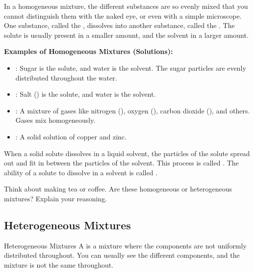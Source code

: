 In a homogeneous mixture, the different substances are so evenly mixed that you cannot distinguish them with the naked eye, or even with a simple microscope.  One substance, called the , dissolves into another substance, called the . The solute is usually present in a smaller amount, and the solvent in a larger amount.

\begin{example}
\textbf{Examples of Homogeneous Mixtures (Solutions):}
\begin{itemize}
    \item {}: Sugar is the solute, and water is the solvent. The sugar particles are evenly distributed throughout the water.
    \item {}: Salt () is the solute, and water is the solvent.
    \item {}: A mixture of gases like nitrogen (), oxygen (), carbon dioxide (), and others. Gases mix homogeneously.
    \item {}: A solid solution of copper and zinc.
\end{itemize}
\end{example}


When a solid solute dissolves in a liquid solvent, the particles of the solute spread out and fit in between the particles of the solvent. This process is called .  The ability of a solute to dissolve in a solvent is called .

\begin{stopandthink}
Think about making tea or coffee. Are these homogeneous or heterogeneous mixtures? Explain your reasoning.
\end{stopandthink}

\subsection{Heterogeneous Mixtures}


\begin{keyconcept}{Heterogeneous Mixtures}
A  is a mixture where the components are not uniformly distributed throughout. You can usually see the different components, and the mixture is not the same throughout.
\end{keyconcept}

